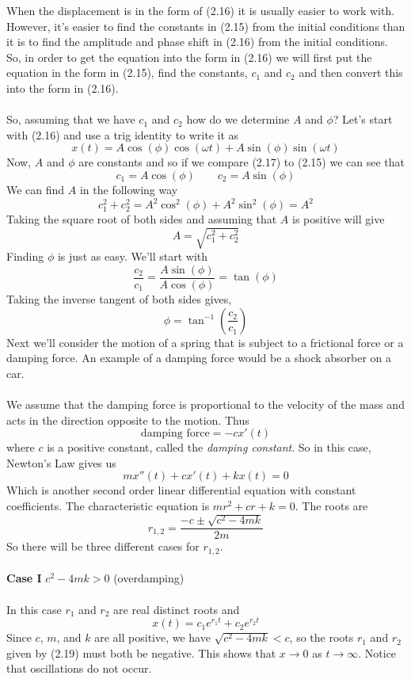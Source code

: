 \documentclass[10pt,reqno]{book}
\theoremstyle{definition}
\begin{document}
	When the displacement is in the form of (2.16) it is usually easier to work with.  However, it's easier to find the constants in (2.15) from the initial conditions than it is to find the amplitude and phase shift in (2.16) from the initial conditions. So, in order to get the equation into the form in (2.16) we will first put the equation in the form in (2.15), find the constants, $ c_1 $ and $ c_2 $ and then convert this into the form in (2.16).\\ \\
	So, assuming that we have $ c_1 $ and $ c_2 $ how do we determine $ A $ and $ \phi $?  Let’s start with (2.16) and use a trig identity to write it as
	\begin{equation}
		x(t) = A\cos(\phi)\cos(\omega t) + A\sin(\phi)\sin(\omega t)
	\end{equation}
	Now, $ A $ and $ \phi $ are constants and so if we compare (2.17) to (2.15) we can see that
	\[ c_1 = A\cos(\phi) \qquad c_2 = A\sin(\phi) \]
	We can find $ A $ in the following way
	\[ c_1^2 + c_2^2 = A^2\cos^2(\phi) + A^2\sin^2(\phi) = A^2 \]
	Taking the square root of both sides and assuming that $ A $ is positive will give
	\[ A = \sqrt{c_1^2 + c_2^2} \]
	Finding $ \phi $ is just as easy. We'll start with
	\[ \frac{c_2}{c_1} = \frac{A\sin(\phi)}{A\cos(\phi)} = \tan(\phi) \]
	Taking the inverse tangent of both sides gives,
	\[ \phi = \tan^{-1}\left( \frac{c_2}{c_1} \right) \]
	Next we'll consider the motion of a spring that is subject to a frictional force or a damping force. An example of a damping force would be a shock absorber on a car. \\ \\
	We assume that the damping force is proportional to the velocity of the mass and acts in the direction opposite to the motion. Thus
	\[ \text{damping force} = -cx'(t) \]
	where $ c $ is a positive constant, called the \textit{damping constant}. So in this case, Newton's Law gives us
	\begin{equation}
		mx''(t) + cx'(t) + kx(t) = 0
	\end{equation}
	Which is another second order linear differential equation with constant coefficients. The characteristic equation is $ mr^2 + cr + k = 0 $. The roots are
	\begin{equation}
		r_{1,2} = \frac{-c \pm \sqrt{c^2 - 4mk}}{2m}
	\end{equation}
	So there will be three different cases for $ r_{1,2} $.\\ \\
	\textbf{Case I} $ c^2 - 4mk > 0 $ (overdamping)\\ \\
	In this case $ r_1 $ and $ r_2 $ are real distinct roots and 
	\[ x(t) = c_1 e^{r_1 t} + c_2 e^{r_2 t} \]
	Since $ c $, $ m $, and $ k $ are all positive, we have $ \sqrt{c^2 - 4mk} < c $, so the roots $ r_1 $ and $ r_2 $ given by (2.19) must both be negative. This shows that $ x \to 0 $ as $ t \to \infty $. Notice that oscillations do not occur.
	
\end{document}
